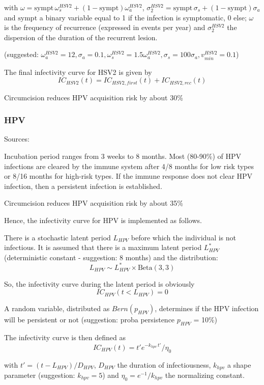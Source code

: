 \documentclass[11pt, onecolumn]{article}
\begin{document}
with $\omega = \mathrm{sympt}\,\omega_s^{HSV2} + (1- \mathrm{sympt})\omega_a^{HSV2}$, $\sigma^{HSV2}_2 = \mathrm{sympt}\,\sigma_s + (1- \mathrm{sympt})\sigma_a$ and  $ \mathrm{sympt}$ a binary variable equal to 1 if the infection is symptomatic, 0 else; $\omega$ is the frequency of recurrence (expressed in events per year) and $\sigma^{HSV2}_2$ the dispersion of the duration of the recurrent lesion.

(suggested: $\omega_a^{HSV2}=12, \sigma_a=0.1, \omega_s^{HSV2}=1.5\omega_a^{HSV2}, \sigma_s=100\sigma_a, v_{min}^{HSV2}=0.1$) 

The final infectivity curve for HSV2 is given by
$$IC_{HSV2}(t) = IC_{HSV2,first}(t) + IC_{HSV2,rec}(t)   $$


Circumcision reduces HPV acquisition risk by about 30\% \cite{Tobian:2009kp}


\subsubsection{HPV}

Sources: \cite{Stanley:2011dd} \cite{Baussano:2013dh}


Incubation period ranges from 3 weeks to 8 months. Most (80-90\%) of HPV infections are cleared by the immune system after 4/8 months for low risk types or 8/16 months for high-risk types. If the immune response does not clear HPV infection, then a persistent infection is established.

Circumcision reduces HPV acquisition risk by about 35\% \cite{Tobian:2009kp}

Hence, the infectivity curve for HPV is implemented as follows. 

There is a stochastic latent period $L_{HPV}$ before which the individual is not infectious. It is assumed that there is a maximum latent period $L_{HPV}^*$ (deterministic constant - suggestion: 8 months) and the distribution:
$$L_{HPV} \sim L_{HPV}^* \times \mathrm{Beta}(3,3) $$

So, the infectivity curve during the latent period is obviously
$$IC_{HPV}(t< L_{HPV}) = 0$$

A random variable, distributed as $Bern(p_{HPV})$, determines if the HPV infection will be persistent or not (suggestion: proba persistence $p_{HPV}$ = 10\%)

The infectivity curve is then defined as
$$IC_{HPV}(t) = t' e^{-k_{hpv}\, t' }/ \eta_0$$

with $t' = (t-L_{HPV})/D_{HPV} $, $D_{HPV}$ the duration of infectiousness, $k_{hpv}$  a shape parameter (suggestion: $k_{hpv}=5$) and $\eta_0=e^{-1}/k_{hpv}$ the normalizing constant.
\end{document}
